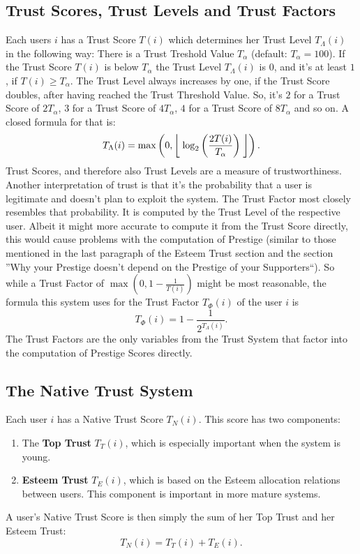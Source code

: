\documentclass[a4paper,12pt]{scrartcl}
\newcounter{formula}
\begin{document}
\subsection{Trust Scores, Trust Levels and Trust Factors}
Each users $i$ has a Trust Score $T(i)$ which determines her Trust Level $T_{\Lambda}(i)$ in the following way: There is a Trust Treshold Value $T_{\alpha}$ (default: $T_{\alpha} = 100$). If the Trust Score $T(i)$ is below $T_{\alpha}$ the Trust Level $T_{\Lambda}(i)$ is $0$, and it's at least $1$, if $T(i) \geq T_{\alpha}$. The Trust Level always increases by one, if the Trust Score doubles, after having reached the Trust Threshold Value. So, it's $2$ for a Trust Score of $2 T_{\alpha}$, $3$ for a Trust Score of $4 T_{\alpha}$, $4$ for a Trust Score of $8 T_{\alpha}$ and so on. A closed formula for that is:
$$T_{\Lambda}(i) = \max \left( 0, \biggm\lfloor  \log_2 \left( \frac{2T(i)}{T_{\alpha}}\right) \biggm\rfloor \right).$$
Trust Scores, and therefore also Trust Levels are a measure of trustworthiness. Another interpretation of trust is that it's the probability that a user is legitimate and doesn't plan to exploit the system. The Trust Factor most closely resembles that probability. It is computed by the Trust Level of the respective user. Albeit it might more accurate to compute it from the Trust Score directly, this would cause problems with the computation of Prestige (similar to those mentioned in the last paragraph of the Esteem Trust section and the section ''Why your Prestige doesn't depend on the Prestige of your Supporters``). So while a Trust Factor of $\max \left(0,1- \frac{1}{T(i)} \right)$ might be most reasonable, the formula this system uses for the Trust Factor $T_{\Phi}(i)$ of the user $i$ is
$$T_{\Phi}(i) = 1 - \frac{1}{2^{T_{\Lambda}(i)}}.$$
The Trust Factors are the only variables from the Trust System that factor into the computation of Prestige Scores directly.

\subsection{The Native Trust System}
Each user $i$ has a Native Trust Score $T_N(i)$. This score has two components: 

\begin{enumerate}
 \item The \textbf{Top Trust} $T_T(i)$, which is especially important when the system is young.
 \item \textbf{Esteem Trust} $T_E(i)$, which is based on the Esteem allocation relations between users. This component is important in more mature systems.
\end{enumerate}
A user's Native Trust Score is then simply the sum of her Top Trust and her Esteem Trust:
$$ T_N(i) = T_T(i) + T_E(i).$$
\end{document}
